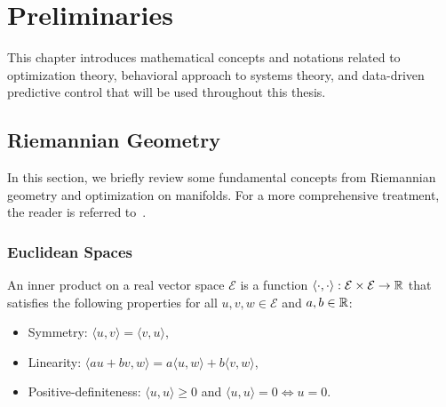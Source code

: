 \chapter{Preliminaries} \label{ch:Preliminaries}

This chapter introduces mathematical concepts and notations related to optimization theory, behavioral approach to systems theory, and data-driven predictive control that will be used throughout this thesis.

\section{Riemannian Geometry} \label{sec:opt}

In this section, we briefly review some fundamental concepts from Riemannian geometry and optimization on manifolds. For a more comprehensive treatment, the reader is referred to~\cite{absil,boumal2023}.

\subsection{Euclidean Spaces}
\begin{definition}
    An inner product on a real vector space $\mathcal{E}$ is a function $\langle \cdot, \cdot \rangle : \mathcal{E} \times \mathcal{E} \to \mathbb{R}$ that satisfies the following properties for all $u,v,w \in \mathcal{E}$ and $a,b \in \mathbb{R}$:
    \begin{itemize}
        \item Symmetry: $\langle u, v \rangle = \langle v, u \rangle$,
        \item Linearity: $\langle au + bv, w \rangle = a\langle u, w \rangle + b\langle v, w \rangle$,
        \item Positive-definiteness: $\langle u, u \rangle \geq 0$ and $\langle u, u \rangle = 0 \iff u = 0$.
    \end{itemize}

\end{definition}


